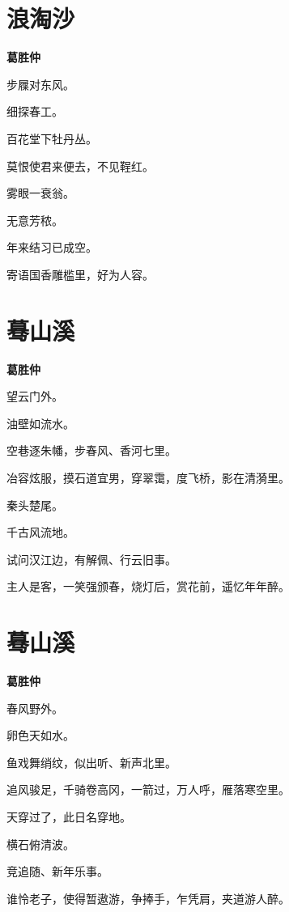 \documentclass[12pt,a4paper]{ctexbook}
\begin{document}
\section{浪淘沙}
\textbf{葛胜仲}\par\vspace{0.5em}
步屧对东风。\par
细探春工。\par
百花堂下牡丹丛。\par
莫恨使君来便去，不见鞓红。\par
雾眼一衰翁。\par
无意芳秾。\par
年来结习已成空。\par
寄语国香雕槛里，好为人容。\par

\section{蓦山溪}
\textbf{葛胜仲}\par\vspace{0.5em}
望云门外。\par
油壁如流水。\par
空巷逐朱幡，步春风、香河七里。\par
冶容炫服，摸石道宜男，穿翠霭，度飞桥，影在清漪里。\par
秦头楚尾。\par
千古风流地。\par
试问汉江边，有解佩、行云旧事。\par
主人是客，一笑强颁春，烧灯后，赏花前，遥忆年年醉。\par

\section{蓦山溪}
\textbf{葛胜仲}\par\vspace{0.5em}
春风野外。\par
卵色天如水。\par
鱼戏舞绡纹，似出听、新声北里。\par
追风骏足，千骑卷高冈，一箭过，万人呼，雁落寒空里。\par
天穿过了，此日名穿地。\par
横石俯清波。\par
竞追随、新年乐事。\par
谁怜老子，使得暂遨游，争捧手，乍凭肩，夹道游人醉。\par
\end{document}
